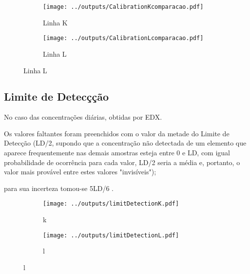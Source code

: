 \begin{figure}[H]
  \caption{Calibrações de Fluorescência de Raiox X em 3 períodos \label{fig:compara_calibracao}}
  \begin{subfigure}[b]{0.5\textwidth}
    \texttt{[image: ../outputs/CalibrationKcomparacao.pdf]}
    \caption{Linha K}
  \end{subfigure}%
  \begin{subfigure}[b]{0.5\textwidth}
    \texttt{[image: ../outputs/CalibrationLcomparacao.pdf]}
    \caption{Linha L}
  \end{subfigure}
\end{figure}

\subsection{Limite de Detecçção}


No caso das concentrações diárias, obtidas por EDX.  

Os valores faltantes foram preenchidos com o valor da metade do Limite de Detecção 
(LD/2, supondo que a concentração não detectada de um elemento que aparece 
frequentemente nas demais amostras esteja entre 0 e LD, com igual 
probabilidade de ocorrência para cada valor, LD/2 seria a média e, portanto, 
o valor mais provável entre estes valores "invisíveis"); 

para sua incerteza tomou-se 5LD/6 \cite{polissar1998}.

\begin{figure}[H]
  \caption{}
  \begin{subfigure}[b]{0.5\textwidth}
    \texttt{[image: ../outputs/limitDetectionK.pdf]}
    \caption{k}
  \end{subfigure}%
  \begin{subfigure}[b]{0.5\textwidth}
    \texttt{[image: ../outputs/limitDetectionL.pdf]}
    \caption{l}
  \end{subfigure}
\end{figure}

